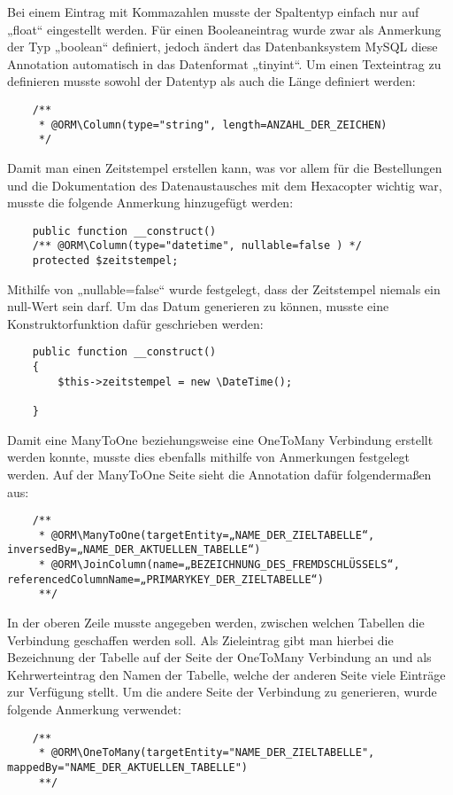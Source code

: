 	Bei einem Eintrag mit Kommazahlen musste der Spaltentyp einfach nur auf „float“ eingestellt werden. Für einen Booleaneintrag wurde zwar als Anmerkung der Typ „boolean“ definiert, jedoch ändert das Datenbanksystem MySQL diese Annotation automatisch in das Datenformat „tinyint“.
	Um einen Texteintrag zu definieren musste sowohl der Datentyp als auch die Länge definiert werden:
	\lstset{language = php}
  	\begin{lstlisting}
  	/**
     * @ORM\Column(type="string", length=ANZAHL_DER_ZEICHEN)
     */
  	\end{lstlisting}
	Damit man einen Zeitstempel erstellen kann, was vor allem für die Bestellungen und die Dokumentation des Datenaustausches mit dem Hexacopter wichtig war, musste die folgende Anmerkung hinzugefügt werden:
	\lstset{language = php}
  	\begin{lstlisting}
  	public function __construct()
    /** @ORM\Column(type="datetime", nullable=false ) */
    protected $zeitstempel;
  	\end{lstlisting}
	Mithilfe von „nullable=false“ wurde festgelegt, dass der Zeitstempel niemals ein null-Wert sein darf.
	Um das Datum generieren zu können, musste eine Konstruktorfunktion dafür geschrieben werden:
	\lstset{language = php}
  	\begin{lstlisting}
  	public function __construct()
    {
        $this->zeitstempel = new \DateTime();

    }
  	\end{lstlisting}
	Damit eine ManyToOne beziehungsweise eine OneToMany Verbindung erstellt werden konnte, musste dies ebenfalls mithilfe von Anmerkungen festgelegt werden.
	Auf der ManyToOne Seite sieht die Annotation dafür folgendermaßen aus:
	\lstset{language = php}
  	\begin{lstlisting}
  	/**
     * @ORM\ManyToOne(targetEntity=„NAME_DER_ZIELTABELLE“, inversedBy=„NAME_DER_AKTUELLEN_TABELLE“)
     * @ORM\JoinColumn(name=„BEZEICHNUNG_DES_FREMDSCHLÜSSELS“, referencedColumnName=„PRIMARYKEY_DER_ZIELTABELLE“)
     **/
  	\end{lstlisting}
	In der oberen Zeile musste angegeben werden, zwischen welchen Tabellen die Verbindung geschaffen werden soll. Als Zieleintrag gibt man hierbei die Bezeichnung der Tabelle auf der Seite der OneToMany Verbindung an und als Kehrwerteintrag den Namen der Tabelle, welche der anderen Seite viele Einträge zur Verfügung stellt.
	Um die andere Seite der Verbindung zu generieren, wurde folgende Anmerkung verwendet:
	\lstset{language = php}
  	\begin{lstlisting}
  	/**
     * @ORM\OneToMany(targetEntity="NAME_DER_ZIELTABELLE", mappedBy="NAME_DER_AKTUELLEN_TABELLE")
     **/
  	\end{lstlisting}
